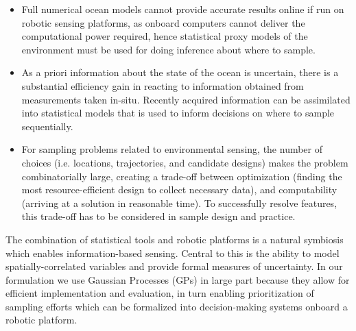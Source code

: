 \documentclass[aoas]{imsart}
\begin{document}
\begin{itemize}
\item Full numerical ocean models cannot provide accurate results online if run on robotic sensing platforms, as onboard computers cannot deliver the computational power required, hence statistical proxy models of the environment must be used for doing inference about where to sample.
\item As a priori information about the state of the ocean is uncertain, there is a substantial efficiency gain in reacting to information obtained from measurements taken in-situ. Recently acquired information can be assimilated into statistical models that is used to inform decisions on where to sample sequentially.%
\item For sampling problems related to environmental sensing, the number of choices (i.e. locations, trajectories, and candidate designs) makes the problem combinatorially large, creating a trade-off between optimization (finding the most resource-efficient design to collect necessary data), and computability (arriving at a solution in reasonable time). To successfully resolve features, this trade-off has to be considered in sample design and practice.
\end{itemize}

The combination of statistical tools and robotic platforms is a
natural symbiosis which enables information-based sensing. Central to
this is the ability to model spatially-correlated variables and
provide formal measures of uncertainty. In our formulation we use
Gaussian Processes (GPs) in large part because they allow for
efficient implementation and evaluation, in turn enabling
prioritization of sampling efforts which can be formalized into decision-making systems onboard a robotic platform.


\end{document}
